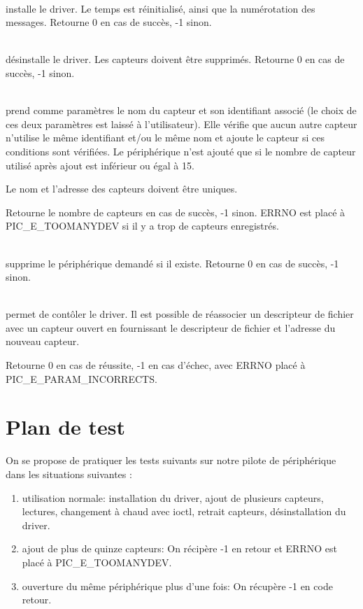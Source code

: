 \begin{m_desc}

 \item [PIC\_DrvInstall] \hfill\\
installe le driver.
Le temps est réinitialisé, ainsi que la numérotation des messages.
Retourne 0 en cas de succès, -1 sinon.

 \item [PIC\_DrvRemove] \hfill\\
désinstalle le driver.
Les capteurs doivent être supprimés.
Retourne 0 en cas de succès, -1 sinon.

 \item [PIC\_DevAdd] \hfill\\
 prend comme paramètres le nom du capteur et son identifiant associé (le choix de 
ces deux paramètres est laissé à l'utilisateur). Elle vérifie que aucun autre 
capteur n'utilise le même identifiant et/ou le même nom et ajoute le capteur
 si ces conditions sont vérifiées.
Le périphérique n'est ajouté que si le nombre de capteur utilisé après ajout
 est inférieur ou égal à 15.

Le nom et l'adresse des capteurs doivent être uniques.

Retourne le nombre de capteurs en cas de succès, -1 sinon.
ERRNO est placé à PIC\_E\_TOOMANYDEV si il y a trop de capteurs enregistrés.

 \item [PIC\_DevDelete] \hfill\\
supprime le périphérique demandé si il existe. 
Retourne 0 en cas de succès, -1 sinon.


\item [PIC\_ioctl]\hfill\\
permet de contôler le driver.
Il est possible de réassocier un descripteur de fichier avec un capteur ouvert
en fournissant le descripteur de fichier et l'adresse du nouveau capteur.

Retourne 0 en cas de réussite, -1 en cas d'échec, avec ERRNO placé à 
PIC\_E\_PARAM\_INCORRECTS.
\end{m_desc}


\section{Plan de test}

On se propose de pratiquer les tests suivants sur notre pilote de périphérique dans les situations suivantes :

\begin{enumerate}
 \item utilisation normale:
        installation du driver, ajout de plusieurs capteurs, lectures, 
changement à chaud avec ioctl, retrait capteurs, désinstallation du driver.
 \item ajout de plus de quinze capteurs:
On récipère -1 en retour et ERRNO est placé à PIC\_E\_TOOMANYDEV.
 \item ouverture du même périphérique plus d'une fois:
On récupère -1 en code retour.
\end{enumerate}
